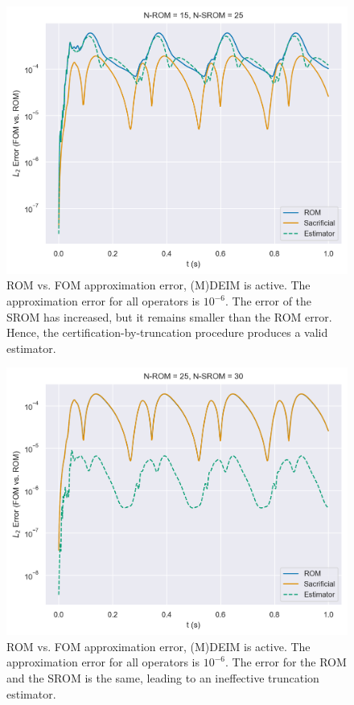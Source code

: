 \documentclass[../../thesis.tex]{subfiles}
\begin{document}
\newpage
\begin{figure}[h]
    \includegraphics[width =\columnwidth]{research_project/piston/figures/nonlinear_displacement/truncation_error/deim/error_estimation_rom_15_srom_25_0.png}
    \caption{ROM vs. FOM approximation error, (M)DEIM is active.
    The approximation error for all operators is $10^{-6}$.
    The error of the SROM has increased, but it remains smaller than the ROM error.
    Hence, the certification-by-truncation procedure produces a valid estimator.
    }
    \label{fig:nlinear_disp_deim_errors_above_threshold}
\end{figure}

\begin{figure}[h]
    \includegraphics[width =\columnwidth]{research_project/piston/figures/nonlinear_displacement/truncation_error/deim/error_estimation_rom_25_srom_30_0.png}
    \caption{ROM vs. FOM approximation error, (M)DEIM is active.
    The approximation error for all operators is $10^{-6}$.
    The error for the ROM and the SROM is the same, leading to an ineffective truncation estimator.}
    \label{fig:nlinear_disp_deim_errors_below_threshold}
\end{figure}
\end{document}
